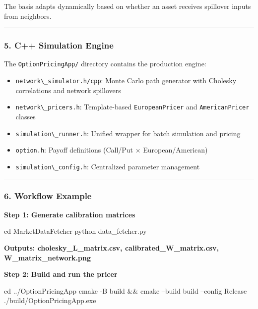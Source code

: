 \documentclass[
]{article}
\newcommand{\passthrough}[1]{#1}
\providecommand{\tightlist}{%
  \setlength{\itemsep}{0pt}\setlength{\parskip}{0pt}}
\begin{document}
The basis adapts dynamically based on whether an asset receives
spillover inputs from neighbors.

\begin{center}\rule{0.5\linewidth}{0.5pt}\end{center}

\subsubsection{5. C++ Simulation Engine}\label{c-simulation-engine}

The \passthrough{\lstinline!OptionPricingApp/!} directory contains the
production engine:

\begin{itemize}
\tightlist
\item
  \passthrough{\lstinline!network\_simulator.h/cpp!}: Monte Carlo path
  generator with Cholesky correlations and network spillovers
\item
  \passthrough{\lstinline!network\_pricers.h!}: Template-based
  \passthrough{\lstinline!EuropeanPricer!} and
  \passthrough{\lstinline!AmericanPricer!} classes
\item
  \passthrough{\lstinline!simulation\_runner.h!}: Unified wrapper for
  batch simulation and pricing
\item
  \passthrough{\lstinline!option.h!}: Payoff definitions (Call/Put ×
  European/American)
\item
  \passthrough{\lstinline!simulation\_config.h!}: Centralized parameter
  management
\end{itemize}

\begin{center}\rule{0.5\linewidth}{0.5pt}\end{center}

\subsubsection{6. Workflow Example}\label{workflow-example}

\textbf{Step 1: Generate calibration matrices}

cd MarketDataFetcher python data\_fetcher.py

\textbf{Outputs: cholesky\_L\_matrix.csv, calibrated\_W\_matrix.csv,
W\_matrix\_network.png}

\textbf{Step 2: Build and run the pricer}

cd ../OptionPricingApp cmake -B build \&\& cmake --build build --config
Release ./build/OptionPricingApp.exe
\end{document}
